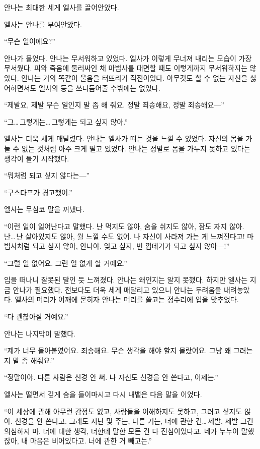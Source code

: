 안나는 최대한 세게 엘사를 끌어안았다.

엘사는 안나를 부여안았다.

``무슨 일이에요?''

안나가 물었다. 안나는 무서워하고 있었다. 엘사가 이렇게 무너져 내리는 모습이 가장 무서웠다. 피와 죽음에 둘러싸인 채 마법사를 대면할 때도 이렇게까지 무서워하지는 않았다. 안나는 거의 똑같이 울음을 터뜨리기 직전이었다. 아무것도 할 수 없는 자신을 싫어하면서도 엘사의 등을 쓰다듬어줄 수밖에는 없었다.

``제발요, 제발 무슨 일인지 말 좀 해 줘요. 정말 죄송해요, 정말 죄송해요—''

``그\ldots\,그렇게는\ldots\,그렇게는 되고 싶지 않아.''

엘사는 더욱 세게 매달렸다. 안나는 엘사가 떠는 것을 느낄 수 있었다. 자신의 몸을 가눌 수 없는 것처럼 아주 크게 떨고 있었다. 안나는 정말로 몸을 가누지 못하고 있다는 생각이 들기 시작했다.

``뭐처럼 되고 싶지 않다는—''

``구스타프가 경고했어.''

엘사는 무심코 말을 꺼냈다.

``이런 일이 일어난다고 말했다. 난 먹지도 않아, 숨을 쉬지도 않아, 잠도 자지 않아. 난\ldots\,난 살아있지도 않아, 뭘 느낄 수도 없어. 나 자신이 사라져 가는 게 느껴진다고! 마법사처럼 되고 싶지 않아, 안나야. 잊고 싶지, 빈 껍데기가 되고 싶지 않아—!''

``그럴 일 없어요. 그런 일 없게 할 거예요.''

입을 떠나니 잘못된 말인 듯 느껴졌다. 안나는 왜인지는 알지 못했다. 하지만 엘사는 지금 안나가 필요했다. 전보다도 더욱 세게 매달리고 있으니 안나는 두려움을 내려놓았다. 엘사의 머리가 어깨에 묻히자 안나는 머리를 쓸고는 정수리에 입을 맞추었다.

``다 괜찮아질 거예요.''

안나는 나지막이 말했다.

``제가 너무 몰아붙였어요. 죄송해요. 무슨 생각을 해야 할지 몰랐어요. 그냥 왜 그러는지 말 좀 해줘요.''

``정말이야. 다른 사람은 신경 안 써. 나 자신도 신경을 안 쓴다고, 이제는.''

엘사는 떨면서 깊게 숨을 들이마시고 다시 내뱉은 다음 말을 이었다.

``이 세상에 관해 아무런 감정도 없고, 사람들을 이해하지도 못하고, 그러고 싶지도 않아. 신경을 안 쓴다고. 그래도 지난 몇 주는, 다른 거는, 너에 관한 건\ldots\,제발, 제발 그건 의심하지 마. 너에 대한 생각, 너한테 말한 모든 건 다 진심이었다고. 네가 누누이 말했잖아, 내 마음은 비어있다고. 너에 관한 거 빼고는.''

